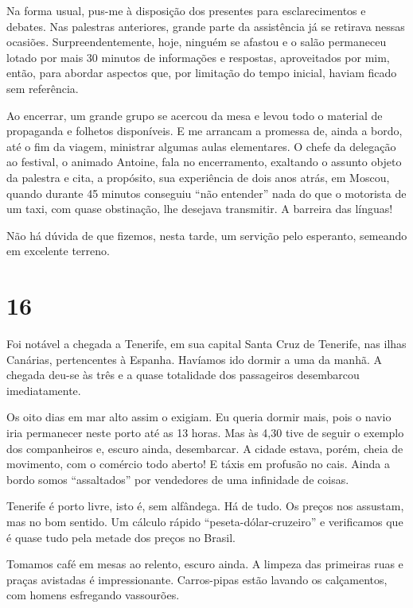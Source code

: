 Na forma usual, pus-me à disposição dos presentes para esclarecimentos e debates. Nas palestras anteriores, grande parte da assistência já se retirava nessas ocasiões. Surpreendentemente, hoje, ninguém se afastou e o salão permaneceu lotado por mais 30 minutos de informações e respostas, aproveitados por mim, então, para abordar aspectos que, por limitação do tempo inicial, haviam ficado sem referência.

Ao encerrar, um grande grupo se acercou da mesa e levou todo o material de propaganda e folhetos disponíveis. E me arrancam a promessa de, ainda a bordo, até o fim da viagem, ministrar algumas aulas elementares. O chefe da delegação ao festival, o animado Antoine, fala no encerramento, exaltando o assunto objeto da palestra e cita, a propósito, sua experiência de dois anos atrás, em Moscou, quando durante 45 minutos conseguiu ``não entender'' nada do que o motorista de um taxi, com quase obstinação, lhe desejava transmitir. A barreira das línguas!

Não há dúvida de que fizemos, nesta tarde, um servição pelo esperanto, semeando em excelente terreno.

\section*{16 \adfflatleafright {}}

Foi notável a chegada a Tenerife, em sua capital Santa Cruz de Tenerife, nas ilhas Canárias, pertencentes à Espanha. Havíamos ido dormir a uma da manhã. A chegada deu-se às três e a quase totalidade dos passageiros desembarcou imediatamente.

Os oito dias em mar alto assim o exigiam. Eu queria dormir mais, pois o navio iria permanecer neste porto até as 13 horas. Mas às 4,30 tive de seguir o exemplo dos companheiros e, escuro ainda, desembarcar. A cidade estava, porém, cheia de movimento, com o comércio todo aberto! E táxis em profusão no cais. Ainda a bordo somos ``assaltados'' por vendedores de uma infinidade de coisas.

Tenerife é porto livre, isto é, sem alfândega. Há de tudo. Os preços nos assustam, mas no bom sentido. Um cálculo rápido ``peseta-dólar-cruzeiro'' e verificamos que é quase tudo pela metade dos preços no Brasil.

Tomamos café em mesas ao relento, escuro ainda. A limpeza das primeiras ruas e praças avistadas é impressionante. Carros-pipas estão lavando os calçamentos, com homens esfregando vassourões.

